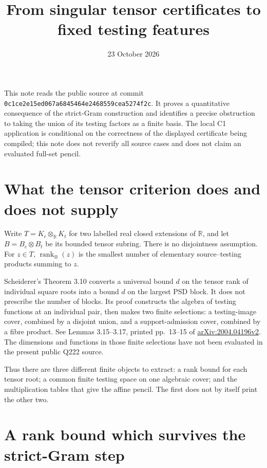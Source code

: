 \documentclass[11pt]{article}
\title{From singular tensor certificates to fixed testing features}
\author{}
\date{23 October 2026}
\newcommand{\R}{\mathbb R}
\newcommand{\rankt}{\operatorname{rank}_{\otimes}}
\begin{document}
\maketitle

\noindent
This note reads the public source at commit
\texttt{0c1ce2e15ed067a6845464e2468559cea5274f2c}.
It proves a quantitative consequence of the strict-Gram construction
and identifies a precise obstruction to taking the union of its
testing factors as a finite basis. The local C1 application is
conditional on the correctness of the displayed certificate being
compiled; this note does not reverify all source cases and does not
claim an evaluated full-set pencil.

\section{What the tensor criterion does and does not supply}

Write $T=K_c\otimes_{\R}K_t$ for two labelled real closed
extensions of $\R$, and let $B=B_c\otimes B_t$ be its bounded
tensor subring. There is no disjointness assumption.
For $z\in T$, $\rankt(z)$ is the smallest number of elementary
source--testing products summing to $z$.

Scheiderer's Theorem 3.10 converts a universal bound $d$ on the
tensor rank of individual square roots into a bound $d$ on the
largest PSD block. It does not prescribe the number of blocks.
Its proof constructs the algebra of testing functions at an
individual pair, then makes two finite selections: a testing-image
cover, combined by a disjoint union, and a support-admission cover,
combined by a fibre product. See Lemmas 3.15--3.17, printed
pp.~13--15 of
\href{https://arxiv.org/pdf/2004.04196}{arXiv:2004.04196v2}.
The dimensions and functions in those finite selections have not
been evaluated in the present public Q222 source.

Thus there are three different finite objects to extract:
a rank bound for each tensor root; a common finite testing space
on one algebraic cover; and the multiplication tables that give
the affine pencil. The first does not by itself print the other two.

\section{A rank bound which survives the strict-Gram step}
\end{document}
